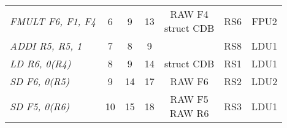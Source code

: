 \begin{enumerate}
\begin{table}[H]
\begin{tabular}{l|ccc|ccc}
            \textit{FMULT F6, F1, F4}                 & 6              & 9                  & 13             & \makecell{RAW F4 \\ struct CDB} & RS6         & FPU2          \\
            \textit{ADDI R5, R5, 1}                   & 7              & 8                  & 9              &                                 & RS8         & LDU1          \\
            \textit{LD R6, 0(R4)}                     & 8              & 9                  & 14             & struct CDB                      & RS1         & LDU1          \\
            \textit{SD F6, 0(R5)}                     & 9              & 14                 & 17             & RAW F6                          & RS2         & LDU2          \\
            \textit{SD F5, 0(R6)}                     & 10             & 15                 & 18             & \makecell{RAW F5 \\ RAW R6}     & RS3         & LDU1         
            \end{tabular}
        \end{table}
\end{enumerate}
